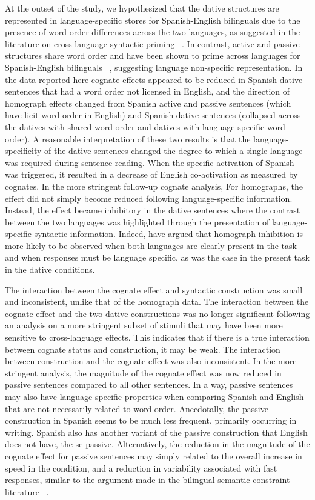 At the outset of the study, we hypothesized that the dative structures are represented in language-specific stores for Spanish-English bilinguals due to the presence of word order differences across the two languages, as suggested in the literature on cross-language syntactic priming ~\citep[e.g.,][]{Bernolet2007}. In contrast, active and passive structures share word order and have been shown to prime across languages for Spanish-English bilinguals ~\citep{Hartsuiker2004}, suggesting language non-specific representation. In the data reported here cognate effects appeared to be reduced in Spanish dative sentences that had a word order not licensed in English, and the direction of homograph effects changed from Spanish active and passive sentences (which have licit word order in English) and Spanish dative sentences (collapsed across the datives with shared word order and datives with language-specific word order). A reasonable interpretation of these two results is that the language-specificity of the dative sentences changed the degree to which a single language was required during sentence reading. When the specific activation of Spanish was triggered, it resulted in a decrease of English co-activation as measured by cognates. In the more stringent follow-up cognate analysis, For homographs, the effect did not simply become reduced following language-specific information. Instead, the effect became inhibitory in the dative sentences where the contrast between the two languages was highlighted through the presentation of language-specific syntactic information. Indeed,  \citet{Dijkstra1998} have argued that homograph inhibition is more likely to be observed when both languages are clearly present in the task and when responses must be language specific, as was the case in the present task in the dative conditions. 

The interaction between the cognate effect and syntactic construction was small and inconsistent, unlike that of the homograph data. The interaction between the cognate effect and the two dative constructions was no longer significant following an analysis on a more stringent subset of stimuli that may have been more sensitive to cross-language effects. This indicates that if there is a true interaction between cognate status and construction, it may be weak. The interaction between construction and the cognate effect was also inconsistent. In the more stringent analysis, the magnitude of the cognate effect was now reduced in passive sentences compared to all other sentences. In a way, passive sentences may also have language-specific properties when comparing Spanish and English that are not necessarily related to word order. Anecdotally, the passive construction in Spanish seems to be much less frequent, primarily occurring in writing. Spanish also has another variant of the passive construction that English does not have, the se-passive. Alternatively, the reduction in the magnitude of the cognate effect for passive sentences may simply related to the overall increase in speed in the condition, and a reduction in variability associated with fast responses, similar to the argument made in the bilingual semantic constraint literature ~\citep[e.g.,][]{VanAssche2010}. 

